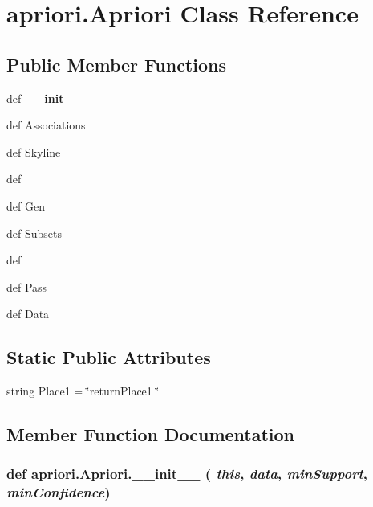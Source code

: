 \section{apriori.Apriori Class Reference}
\label{classapriori_1_1_apriori}
\subsection*{Public Member Functions}
\begin{CompactItemize}
\item 
def {\bf\_\-\_\-init\_\-\_\-}
\item 
def {\bfgenerate\-Associations}
\item 
def {\bfremove\-Skyline}
\item 
def {\bfprune}
\item 
def {\bfcandidate\-Gen}
\item 
def {\bfgen\-Subsets}
\item 
def {\bfsupport}
\item 
def {\bfone\-Pass}
\item 
def {\bfprep\-Data}
\end{CompactItemize}
\subsection*{Static Public Attributes}
\begin{CompactItemize}
\item 
string {\bfreturn\-Place1} = \char`\"{}return\-Place1 \char`\"{}
\end{CompactItemize}


\subsection{Member Function Documentation}
\subsubsection{\setlength{\rightskip}{0pt plus 5cm}def apriori.Apriori.\_\-\_\-init\_\-\_\- ( {\em this},  {\em data},  {\em min\-Support},  {\em min\-Confidence})}\label{classapriori_1_1_apriori_996cb51607b9de05d0aecda80e41905a}


